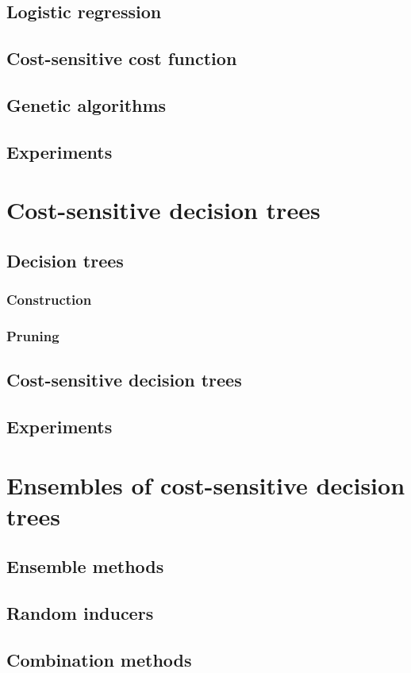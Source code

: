 \documentclass[twoside,openright,titlepage,numbers=noenddot,headinclude,%
               footinclude=true,cleardoublepage=empty,abstractoff,BCOR=5mm,%
               paper=a4,fontsize=11pt,ngerman,american]{scrreprt}
\numberwithin{theorem}{chapter}
\numberwithin{definition}{chapter}
\numberwithin{algorithm}{chapter}
\numberwithin{figure}{chapter}
\numberwithin{table}{chapter}
\numberwithin{equation}{chapter}
\begin{document}
	\section{Logistic regression}
	\section{Cost-sensitive cost function}
	\section{Genetic algorithms}
	\section{Experiments}

\chapter{Cost-sensitive decision trees}
	\section{Decision trees}
		\subsection{Construction}
		\subsection{Pruning}
	\section{Cost-sensitive decision trees}
	\section{Experiments}
	
\chapter{Ensembles of cost-sensitive decision trees}
	\section{Ensemble methods}
	\section{Random inducers}
	\section{Combination methods}
\end{document}
